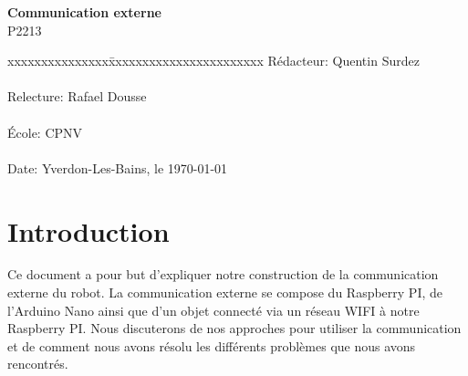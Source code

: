 \documentclass[
	a4paper,									%
	11pt,										%
	twoside,									%
	openright,									%
	notitlepage,									%
	parskip=half,								%
]{scrreprt}										%
\begin{document}
\begin{titlepage}
	\vspace{3cm}

	\fontsize{30pt}{32pt}\selectfont 
	\noindent \textbf{Communication externe} \\

	\fontsize{18pt}{20pt}\selectfont\vspace{0.3em} P2213 \\

	\vspace{4cm}
	\fontsize{12pt}{15pt}\selectfont
	\begin{tabbing}
		xxxxxxxxxxxxxxx\=xxxxxxxxxxxxxxxxxxxxxxx \kill
		Rédacteur:\> Quentin Surdez\\ \\
		Relecture:\> Rafael Dousse\\ \\
		École:\> CPNV\\ \\
		Date:\> Yverdon-Les-Bains, le \today \\
	\end{tabbing}
\end{titlepage}

\tableofcontents

\listoffigures									%
\listoftables									%
\cleardoublepage

\setcounter{page}{1}

\chapter{Introduction}
Ce document a pour but d'expliquer notre construction de la communication externe du robot. 
La communication externe se compose du Raspberry PI, de l'Arduino Nano ainsi que d'un 
objet connecté via un réseau WIFI à notre Raspberry PI. Nous discuterons de nos approches pour utiliser la communication
et de comment nous avons résolu les différents problèmes que nous avons rencontrés. 

\end{document}
